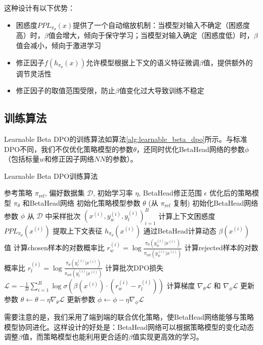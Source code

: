 这种设计有以下优势：
\begin{itemize}
    \item 困惑度$PPL_{\pi_\theta}(x)$提供了一个自动缩放机制：当模型对输入不确定（困惑度高）时，$\beta$值会增大，倾向于保守学习；当模型对输入确定（困惑度低）时，$\beta$值会减小，倾向于激进学习
    \item 修正因子$f(h_{\pi_\theta}(x))$允许模型根据上下文的语义特征微调$\beta$值，提供额外的调节灵活性
    \item 修正因子的取值范围受限，防止$\beta$值变化过大导致训练不稳定
\end{itemize}

\subsection{训练算法}
Learnable Beta DPO的训练算法如算法\ref{alg:learnable_beta_dpo}所示。与标准DPO不同，我们不仅优化策略模型的参数$\theta$，还同时优化BetaHead网络的参数$\phi$（包括标量$w$和修正因子网络$NN$的参数）。

\begin{algorithm}
\caption{Learnable Beta DPO训练算法}
\label{alg:learnable_beta_dpo}
\begin{algorithmic}[1]
\REQUIRE 参考策略 $\pi_{\text{ref}}$, 偏好数据集 $\mathcal{D}$, 初始学习率 $\eta$, BetaHead修正范围 $\epsilon$
\ENSURE 优化后的策略模型 $\pi_\theta$ 和BetaHead网络
\STATE 初始化策略模型参数 $\theta$ (从 $\pi_{\text{ref}}$ 复制)
\STATE 初始化BetaHead网络参数 $\phi$
    \STATE 从 $\mathcal{D}$ 中采样批次 $(x^{(i)}, y_w^{(i)}, y_l^{(i)})_{i=1}^B$
        \STATE 计算上下文困惑度 $PPL_{\pi_\theta}(x^{(i)})$
        \STATE 提取上下文表征 $h_{\pi_\theta}(x^{(i)})$
        \STATE 通过BetaHead计算动态 $\beta(x^{(i)})$ 值
        \STATE 计算chosen样本的对数概率比 $r_w^{(i)} = \log \frac{\pi_\theta(y_w^{(i)}|x^{(i)})}{\pi_{\text{ref}}(y_w^{(i)}|x^{(i)})}$
        \STATE 计算rejected样本的对数概率比 $r_l^{(i)} = \log \frac{\pi_\theta(y_l^{(i)}|x^{(i)})}{\pi_{\text{ref}}(y_l^{(i)}|x^{(i)})}$
    \ENDFOR
    \STATE 计算批次DPO损失 $\mathcal{L} = -\frac{1}{B} \sum_{i=1}^B \log \sigma(\beta(x^{(i)}) \cdot (r_w^{(i)} - r_l^{(i)}))$
    \STATE 计算梯度 $\nabla_\theta \mathcal{L}$ 和 $\nabla_\phi \mathcal{L}$
    \STATE 更新参数 $\theta \leftarrow \theta - \eta \nabla_\theta \mathcal{L}$
    \STATE 更新参数 $\phi \leftarrow \phi - \eta \nabla_\phi \mathcal{L}$
\ENDWHILE
\end{algorithmic}
\end{algorithm}

需要注意的是，我们采用了端到端的联合优化策略，使BetaHead网络能够与策略模型协同进化。这样设计的好处是：BetaHead网络可以根据策略模型的变化动态调整$\beta$值，而策略模型也能利用更合适的$\beta$值实现更高效的学习。 